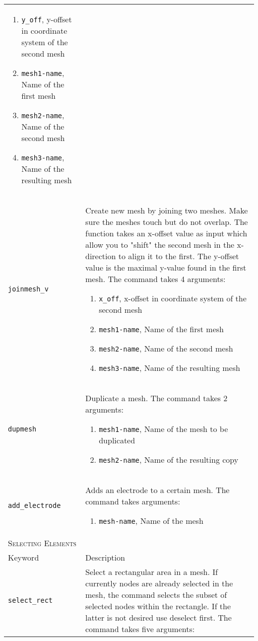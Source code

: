 \documentclass[noshowpacs,preprintnumbers,amsmath,amssymb, letter]{revtex4}
\begin{document}
\begin{longtable}{p{}p{}}
\begin{enumerate}
\item \texttt{y\_off}, y-offset in coordinate system of the second mesh 
\item \texttt{mesh1-name}, Name of the first mesh
\item \texttt{mesh2-name}, Name of the second mesh
\item \texttt{mesh3-name}, Name of the resulting mesh
\end{enumerate}\\
\texttt{joinmesh\_v}	& Create new mesh by joining two meshes. Make sure the meshes touch but do not overlap. The function takes an x-offset value as input which allow you to "shift" the second mesh in the x-direction to align it to the first. The y-offset value is the maximal y-value found in the first mesh. The command takes 4 arguments:
\begin{enumerate}
\item \texttt{x\_off}, x-offset in coordinate system of the second mesh 
\item \texttt{mesh1-name}, Name of the first mesh
\item \texttt{mesh2-name}, Name of the second mesh
\item \texttt{mesh3-name}, Name of the resulting mesh
\end{enumerate}\\
\texttt{dupmesh}	& Duplicate a mesh. The command takes 2 arguments:
\begin{enumerate}
\item \texttt{mesh1-name}, Name of the mesh to be duplicated
\item \texttt{mesh2-name}, Name of the resulting copy
\end{enumerate}\\
\texttt{add\_electrode}	& Adds an electrode to a certain mesh. The command takes arguments:
\begin{enumerate}
\item \texttt{mesh-name}, Name of the mesh
\end{enumerate}\\
\multicolumn{2}{l}{\textsc{Selecting Elements}} \\*
\hline
Keyword & Description \\
\texttt{select\_rect}	& Select a rectangular area in a mesh. If currently nodes are already selected in the mesh, the command selects the subset of selected nodes within the rectangle. If the latter is not desired use deselect first. The command takes five arguments:

\end{longtable}
\end{document}
